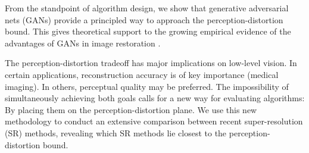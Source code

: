 From the standpoint of algorithm design, we show that generative adversarial nets (GANs) provide a principled way to approach the perception-distortion bound. This gives theoretical support to the growing empirical evidence of the advantages of GANs in image restoration \cite{ledig2016photo,sajjadi2017enhancenet,pathak2016context,yeh2017semantic,rippel2017real,isola2016image,zhu2017unpaired}.


The perception-distortion tradeoff has major implications on low-level vision. In certain applications, reconstruction accuracy is of key importance (\eg medical imaging). In others, perceptual quality may be preferred. The impossibility of simultaneously achieving both goals calls for a new way for evaluating algorithms: By placing them on the perception-distortion plane. We use this new methodology to conduct an extensive comparison between recent super-resolution (SR) methods, revealing which SR methods lie closest to the perception-distortion bound. 